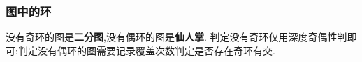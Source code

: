 \subsubsection{图中的环}
没有奇环的图是\textbf{二分图},没有偶环的图是\textbf{仙人掌}.
判定没有奇环仅用深度奇偶性判即可;判定没有偶环的图需要记录覆盖次数判定是否存在奇环有交.